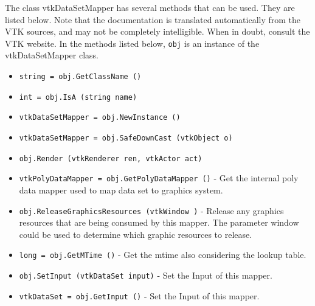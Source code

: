 The class vtkDataSetMapper has several methods that can be used.
  They are listed below.
Note that the documentation is translated automatically from the VTK sources,
and may not be completely intelligible.  When in doubt, consult the VTK website.
In the methods listed below, \verb|obj| is an instance of the vtkDataSetMapper class.
\begin{itemize}
\item  \verb|string = obj.GetClassName ()|

\item  \verb|int = obj.IsA (string name)|

\item  \verb|vtkDataSetMapper = obj.NewInstance ()|

\item  \verb|vtkDataSetMapper = obj.SafeDownCast (vtkObject o)|

\item  \verb|obj.Render (vtkRenderer ren, vtkActor act)|

\item  \verb|vtkPolyDataMapper = obj.GetPolyDataMapper ()| -  Get the internal poly data mapper used to map data set to graphics system.

\item  \verb|obj.ReleaseGraphicsResources (vtkWindow )| -  Release any graphics resources that are being consumed by this mapper.
 The parameter window could be used to determine which graphic
 resources to release.

\item  \verb|long = obj.GetMTime ()| -  Get the mtime also considering the lookup table.

\item  \verb|obj.SetInput (vtkDataSet input)| -  Set the Input of this mapper.

\item  \verb|vtkDataSet = obj.GetInput ()| -  Set the Input of this mapper.

\end{itemize}
